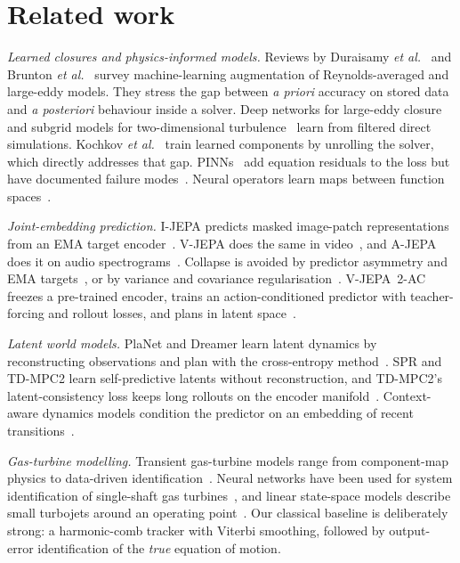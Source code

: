 \documentclass[10pt,journal]{IEEEtran}
\begin{document}
\section{Related work}
\emph{Learned closures and physics-informed models.} Reviews by Duraisamy \emph{et al.}~\cite{duraisamy2019turbulence,duraisamy2021perspectives} and Brunton \emph{et al.}~\cite{brunton2020mlfluids} survey machine-learning augmentation of Reynolds-averaged and large-eddy models. They stress the gap between \emph{a priori} accuracy on stored data and \emph{a posteriori} behaviour inside a solver. Deep networks for large-eddy closure~\cite{beck2019les} and subgrid models for two-dimensional turbulence~\cite{maulik2019subgrid} learn from filtered direct simulations. Kochkov \emph{et al.}~\cite{kochkov2021mlcfd} train learned components by unrolling the solver, which directly addresses that gap. PINNs~\cite{raissi2017pinn} add equation residuals to the loss but have documented failure modes~\cite{krishnapriyan2021failure,wang2021gradient}. Neural operators learn maps between function spaces~\cite{li2021fno,lu2021deeponet}.

\emph{Joint-embedding prediction.} I-JEPA predicts masked image-patch representations from an EMA target encoder~\cite{assran2023ijepa}. V-JEPA does the same in video~\cite{bardes2024vjepa}, and A-JEPA does it on audio spectrograms~\cite{fei2023ajepa}. Collapse is avoided by predictor asymmetry and EMA targets~\cite{grill2020byol}, or by variance and covariance regularisation~\cite{bardes2022vicreg}. V-JEPA~2-AC freezes a pre-trained encoder, trains an action-conditioned predictor with teacher-forcing and rollout losses, and plans in latent space~\cite{assran2025vjepa2}.

\emph{Latent world models.} PlaNet and Dreamer learn latent dynamics by reconstructing observations and plan with the cross-entropy method~\cite{hafner2019planet}. SPR and TD-MPC2 learn self-predictive latents without reconstruction, and TD-MPC2's latent-consistency loss keeps long rollouts on the encoder manifold~\cite{schwarzer2021spr,hansen2024tdmpc2}. Context-aware dynamics models condition the predictor on an embedding of recent transitions~\cite{lee2020cadm}.

\emph{Gas-turbine modelling.} Transient gas-turbine models range from component-map physics to data-driven identification~\cite{yang2024transient}. Neural networks have been used for system identification of single-shaft gas turbines~\cite{asgari2013ann}, and linear state-space models describe small turbojets around an operating point~\cite{beneda2018statespace}. Our classical baseline is deliberately strong: a harmonic-comb tracker with Viterbi smoothing, followed by output-error identification of the \emph{true} equation of motion.
\end{document}
